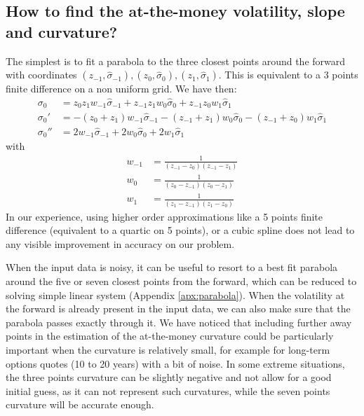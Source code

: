 \documentclass[]{rAMF2e}
\begin{document}
  
%
\subsection{How to find the at-the-money volatility, slope and curvature?}
The simplest is to fit a parabola to the three closest points around the forward with coordinates $(z_{-1}, \hat{\sigma}_{-1}), (z_0,\hat{\sigma}_0), (z_{1},\hat{\sigma}_1)$. This is equivalent to a 3 points finite difference on a non uniform grid. We have then:
\begin{align}
\sigma_0 &= z_0 z_1 w_{-1} \hat{\sigma}_{-1} + z_{-1} z_1 w_{0} \hat{\sigma}_{0} +  z_{-1} z_0w_{1} \hat{\sigma}_{1}\\
\sigma_0' &= -(z_0 + z_1) w_{-1} \hat{\sigma}_{-1} - (z_{-1}+ z_1) w_{0} \hat{\sigma}_{0} -  (z_{-1}+ z_0)w_{1} \hat{\sigma}_{1}\\
\sigma_0'' &= 2 w_{-1} \hat{\sigma}_{-1} +2 w_{0} \hat{\sigma}_{0} + 2w_{1} \hat{\sigma}_{1}
\end{align}
with 
\begin{align}
w_{-1} &= \frac{1}{(z_{-1}-z_{0})(z_{-1}-z_{1})}\\
w_{0} &= \frac{1}{(z_{0}-z_{-1})(z_{0}-z_{1})}\\
w_{1} &= \frac{1}{(z_{1}-z_{-1})(z_{1}-z_{0})}
\end{align}
In our experience, using higher order approximations like a 5 points finite difference (equivalent to a quartic on 5 points), or a cubic spline does not lead to any visible improvement in accuracy on our problem.
 
When the input data is noisy, it can be useful to resort to a best fit parabola around the five or seven closest points from the forward, which can be reduced to solving simple linear system (Appendix \ref{apx:parabola}). When the volatility at the forward is already present in the input data, we can also make sure that the parabola passes exactly through it. We have noticed that including further away points in the estimation of the at-the-money curvature could be particularly important when the curvature is relatively small, for example for long-term options quotes (10 to 20 years) with a bit of noise. In some extreme situations, the three points curvature can be slightly negative and not allow for a good initial guess, as it can not represent such curvatures, while the seven points curvature will be accurate enough.
\end{document}
